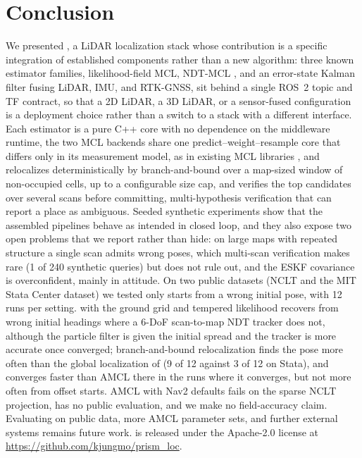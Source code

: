\section{Conclusion}\label{sec:concl}

We presented \sname, a LiDAR localization stack whose contribution is a specific integration of established components rather than a new algorithm: three known estimator families, likelihood-field MCL, NDT-MCL \citep{saarinen2013ndtmcl}, and an error-state Kalman filter fusing LiDAR, IMU, and RTK-GNSS, sit behind a single ROS~2 topic and TF contract, so that a 2D LiDAR, a 3D LiDAR, or a sensor-fused configuration is a deployment choice rather than a switch to a stack with a different interface. Each estimator is a pure C++ core with no dependence on the middleware runtime, the two MCL backends share one predict--weight--resample core that differs only in its measurement model, as in existing MCL libraries \citep{puga2024beluga}, and  relocalizes deterministically by branch-and-bound \citep{hess2016realtime} over a map-sized window of non-occupied cells, up to a configurable size cap, and verifies the top candidates over several scans before committing, multi-hypothesis verification that can report a place as ambiguous. Seeded synthetic experiments show that the assembled pipelines behave as intended in closed loop, and they also expose two open problems that we report rather than hide: on large maps with repeated structure a single scan admits wrong poses, which multi-scan verification makes rare (1 of 240 synthetic queries) but does not rule out, and the ESKF covariance is overconfident, mainly in attitude. On two public datasets (NCLT and the MIT Stata Center dataset) we tested only starts from a wrong initial pose, with 12 runs per setting.  with the ground grid and tempered likelihood recovers from wrong initial headings where a 6-DoF scan-to-map NDT tracker does not, although the particle filter is given the initial spread and the tracker is more accurate once converged; branch-and-bound relocalization finds the pose more often than the global localization of  (9 of 12 against 3 of 12 on Stata), and  converges faster than AMCL there in the runs where it converges, but not more often from offset starts. AMCL with Nav2 defaults fails on the sparse NCLT projection,  has no public evaluation, and we make no field-accuracy claim. Evaluating  on public data, more AMCL parameter sets, and further external systems remains future work. \sname{} is released under the Apache-2.0 license at \url{https://github.com/kjungmo/prism_loc}.

